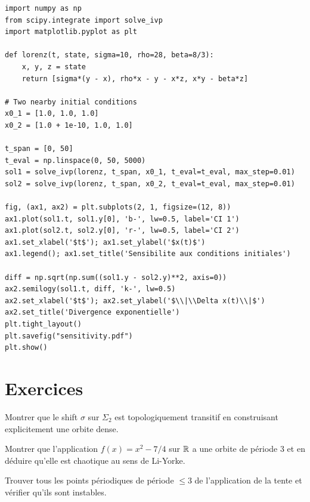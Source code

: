 \begin{codeblock}[title=\textbf{D\'emonstration de la sensibilit\'e aux conditions initiales}]
\begin{verbatim}
import numpy as np
from scipy.integrate import solve_ivp
import matplotlib.pyplot as plt

def lorenz(t, state, sigma=10, rho=28, beta=8/3):
    x, y, z = state
    return [sigma*(y - x), rho*x - y - x*z, x*y - beta*z]

# Two nearby initial conditions
x0_1 = [1.0, 1.0, 1.0]
x0_2 = [1.0 + 1e-10, 1.0, 1.0]

t_span = [0, 50]
t_eval = np.linspace(0, 50, 5000)
sol1 = solve_ivp(lorenz, t_span, x0_1, t_eval=t_eval, max_step=0.01)
sol2 = solve_ivp(lorenz, t_span, x0_2, t_eval=t_eval, max_step=0.01)

fig, (ax1, ax2) = plt.subplots(2, 1, figsize=(12, 8))
ax1.plot(sol1.t, sol1.y[0], 'b-', lw=0.5, label='CI 1')
ax1.plot(sol2.t, sol2.y[0], 'r-', lw=0.5, label='CI 2')
ax1.set_xlabel('$t$'); ax1.set_ylabel('$x(t)$')
ax1.legend(); ax1.set_title('Sensibilite aux conditions initiales')

diff = np.sqrt(np.sum((sol1.y - sol2.y)**2, axis=0))
ax2.semilogy(sol1.t, diff, 'k-', lw=0.5)
ax2.set_xlabel('$t$'); ax2.set_ylabel('$\\|\\Delta x(t)\\|$')
ax2.set_title('Divergence exponentielle')
plt.tight_layout()
plt.savefig("sensitivity.pdf")
plt.show()
\end{verbatim}
\end{codeblock}

\section{Exercices}

\begin{exercice}
Montrer que le shift $\sigma$ sur $\Sigma_2$ est topologiquement transitif
en construisant explicitement une orbite dense.
\end{exercice}

\begin{exercice}[P\'eriode 3]
Montrer que l'application $f(x) = x^2 - 7/4$ sur $\mathbb{R}$ a une orbite de
p\'eriode 3 et en d\'eduire qu'elle est chaotique au sens de Li-Yorke.
\end{exercice}

\begin{exercice}
Trouver tous les points p\'eriodiques de p\'eriode $\leq 3$ de l'application
de la tente et v\'erifier qu'ils sont instables.
\end{exercice}

